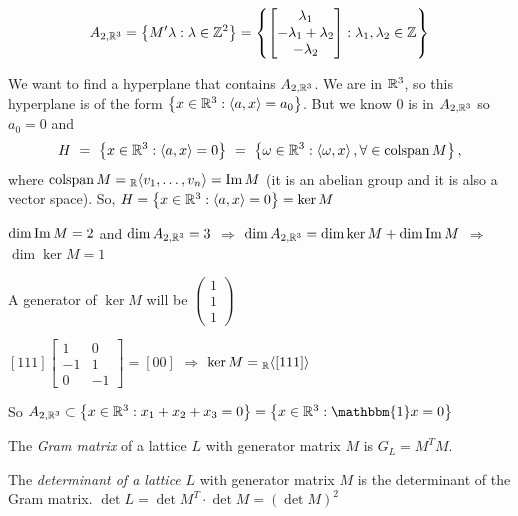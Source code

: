 \begin{displaymath}
	A_{2,\mathbb{R}^{3}}=\left\{M'\lambda:\lambda\in\mathbb{Z}^{2}\right\}=\left\{\begin{bmatrix}
	\lambda_1 \\
	-\lambda_1 + \lambda_2 \\
	-\lambda_2 \end{bmatrix}:\lambda_1,\lambda_2\in\mathbb{Z}\right\}
\end{displaymath}

We want to find a hyperplane that contains $A_{2,\mathbb{R}^{3}}$. We are in $\mathbb{R}^{3}$, so this
hyperplane is of the form $\left\{x\in\mathbb{R}^{3}:\left\langle
    a,x\right\rangle=a_0\right\}$. But we know $0$ is in $A_{2,\mathbb{R}^{3}}$ so $a_0=0$ and
\[
  H \ = \ 
  \left\{x\in\RR^{3}:\left\langle a,x\right\rangle=0\right\} 
  \ = \ 
  \left\{\omega\in\RR^{3}:\left\langle \omega,x\right\rangle, \forall \in \colspan
    M\right\},
\]
 where $\operatorname{colspan}
M={}_{\mathbb{R}}\!\left\langle v_1,\ldots,v_n \right\rangle=\operatorname{Im} M$ (it is an abelian group and it is
also a vector space). So, $H=\left\{x\in\mathbb{R}^{3}: \left\langle
    a,x\right\rangle=0\right\}=\ker M$

$\dim \operatorname{Im} M=2$ and $\dim A_{2,\mathbb{R}^{3}}=3$ $\Longrightarrow$ $\dim A_{2,\mathbb{R}^{3}}=\dim \ker M +\dim \operatorname{Im} M$ $\Longrightarrow$ $\dim \ker M=1$

A generator of $\ker M$ will be $\left(\begin{smallmatrix}
1 \\
1 \\
1 \end{smallmatrix}\right)$

$\left[1 1 1\right]\left[\begin{smallmatrix}
1 & 0 \\
-1 & 1 \\
0 & -1 \end{smallmatrix}\right]=\left[0 0\right]$ $\Rightarrow$ $\ker M= {}_{\mathbb{R}}\!\left\langle \left[1 1 1\right]\right\rangle$

So $A_{2,\RR^{3}}\subset\left\{x\in\RR^{3}: x_1+x_2+x_3=0\right\}=\left\{x\in\RR^{3}: \mathbbm{1}x=0\right\}$


\begin{definition}
The \emph{Gram matrix} of a lattice $L$ with generator matrix $M$ is $G_L=M^{T}M$.
\end{definition}


\begin{definition}
The \emph{determinant of a lattice} $L$ with generator matrix $M$ is the determinant of the Gram matrix.
$\det L=\det M^{T}\cdot \det M=\left(\det M\right)^{2} $
\end{definition}


